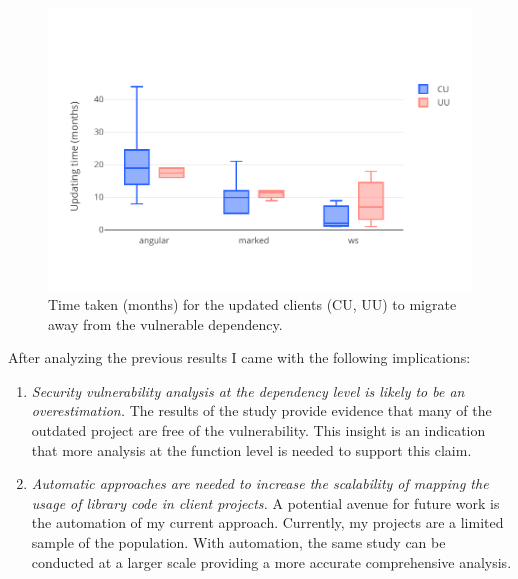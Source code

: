 \begin{figure}[ht]
\centering
\includegraphics[width=1\textwidth]{images/box.pdf}
\caption{Time taken (months) for the updated clients (CU, UU) to migrate away from the vulnerable dependency.}
\label{fig:results2}
\end{figure}

After analyzing the previous results I came with the following implications:
\begin{enumerate}
    \item \textit{Security vulnerability analysis at the dependency level is likely to be an overestimation.}
    The results of the study provide evidence that many of the outdated project are free of the vulnerability.
    This insight is an indication that more analysis at the function level is needed to support this claim.

    \item \textit{Automatic approaches are needed to increase the scalability of mapping the usage of library code in client projects. }
    A potential avenue for future work is the automation of my current approach.
    Currently, my projects are a limited sample of the population. 
    With automation, the same study can be conducted at a larger scale providing a more accurate comprehensive analysis.
\end{enumerate}